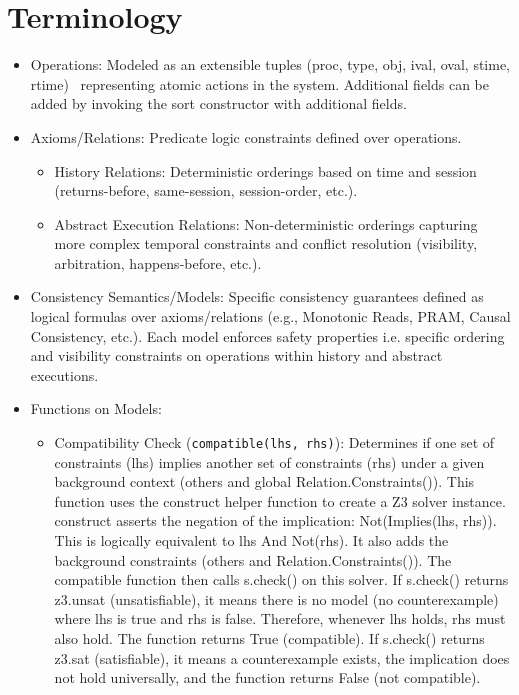 \section{Terminology}


\begin{itemize}
  \item Operations: Modeled as an extensible tuples (proc, type, obj,
      ival, oval, stime,
    rtime)~\cite{viotti2016consistency} representing atomic actions
    in the system.
    Additional fields can be added by invoking the sort constructor
    with additional
    fields.

  \item Axioms/Relations: Predicate logic constraints defined over operations.
    \begin{itemize}
      \item History Relations: Deterministic orderings based on time and session
        (returns-before, same-session, session-order, etc.).
      \item Abstract Execution Relations: Non-deterministic orderings
        capturing more complex
        temporal constraints and conflict resolution (visibility, arbitration,
        happens-before, etc.).
    \end{itemize}

  \item Consistency Semantics/Models: Specific consistency guarantees
    defined as logical
    formulas over axioms/relations (e.g., Monotonic Reads, PRAM,
      Causal Consistency,
    etc.). Each model enforces safety properties i.e. specific ordering and
    visibility constraints on operations within history and abstract executions.

  \item Functions on Models:
    \begin{itemize}
      \item Compatibility Check (\texttt{compatible(lhs, rhs)}):
        Determines if one set of
        constraints (lhs) implies another set of constraints (rhs) under a given
        background context (others and global
        Relation.Constraints()). This function
        uses the construct helper function to create a Z3 solver
        instance. construct
        asserts the negation of the implication: Not(Implies(lhs, rhs)). This is
        logically equivalent to lhs And Not(rhs). It also adds the background
        constraints (others and Relation.Constraints()). The
        compatible function then
        calls s.check() on this solver. If s.check() returns z3.unsat
        (unsatisfiable),
        it means there is no model (no counterexample) where lhs is
        true and rhs is
        false. Therefore, whenever lhs holds, rhs must also hold. The
        function returns
        True (compatible). If s.check() returns z3.sat (satisfiable), it means a
        counterexample exists, the implication does not hold
        universally, and the
        function returns False (not compatible).


\end{itemize}
\end{itemize}
